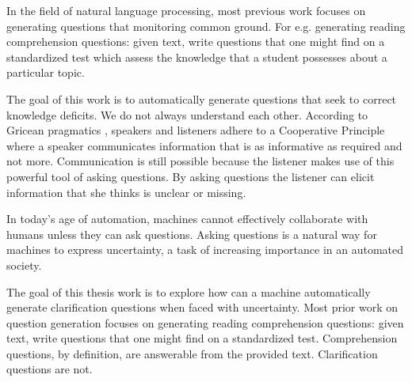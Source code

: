 \documentclass[11pt]{article}
\begin{document}
In the field of natural language processing, most previous work focuses on generating questions that monitoring common ground. For e.g. generating reading comprehension questions:  given text, write questions that one might find on a standardized test which assess the knowledge that a student possesses about a particular topic.



The goal of this work is to automatically generate questions that seek to correct knowledge deficits. We do not always understand each other. According to Gricean pragmatics \cite{grice1975logic}, speakers and listeners adhere to a Cooperative Principle where a speaker communicates information that is as informative as required and not more. Communication is still possible because the listener makes use of this powerful tool of asking questions. By asking questions the listener can elicit information that she thinks is unclear or missing. 

In today's age of automation, machines cannot effectively collaborate with humans unless they can ask questions. Asking questions is a natural way for machines to express uncertainty, a task of increasing importance in an automated society. 

The goal of this thesis work is to explore how can a machine automatically generate clarification questions when faced with uncertainty. Most prior work on question generation focuses on generating reading comprehension questions:  given text, write questions that one might find on a standardized test. Comprehension questions, by definition, are answerable from the provided text. Clarification questions are not. 



%
\end{document}
